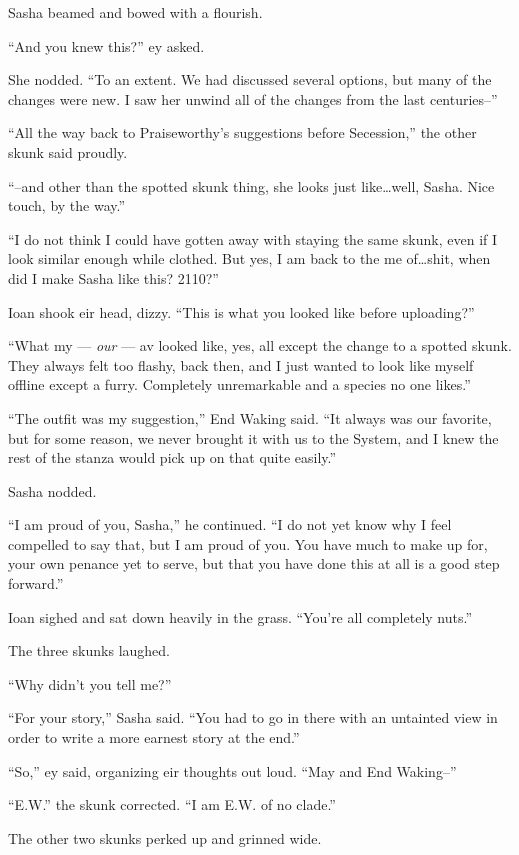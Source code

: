 Sasha beamed and bowed with a flourish.

``And you knew this?'' ey asked.

She nodded. ``To an extent. We had discussed several options, but many of the changes were new. I saw her unwind all of the changes from the last centuries--''

``All the way back to Praiseworthy's suggestions before Secession,'' the other skunk said proudly.

``--and other than the spotted skunk thing, she looks just like\ldots well, Sasha. Nice touch, by the way.''

``I do not think I could have gotten away with staying the same skunk, even if I look similar enough while clothed. But yes, I am back to the me of\ldots shit, when did I make Sasha like this? 2110?''

Ioan shook eir head, dizzy. ``This is what you looked like before uploading?''

``What my — \emph{our} — av looked like, yes, all except the change to a spotted skunk. They always felt too flashy, back then, and I just wanted to look like myself offline except a furry. Completely unremarkable and a species no one likes.''

``The outfit was my suggestion,'' End Waking said. ``It always was our favorite, but for some reason, we never brought it with us to the System, and I knew the rest of the stanza would pick up on that quite easily.''

Sasha nodded.

``I am proud of you, Sasha,'' he continued. ``I do not yet know why I feel compelled to say that, but I am proud of you. You have much to make up for, your own penance yet to serve, but that you have done this at all is a good step forward.''

Ioan sighed and sat down heavily in the grass. ``You're all completely nuts.''

The three skunks laughed.

``Why didn't you tell me?''

``For your story,'' Sasha said. ``You had to go in there with an untainted view in order to write a more earnest story at the end.''

``So,'' ey said, organizing eir thoughts out loud. ``May and End Waking--''

``E.W.'' the skunk corrected. ``I am E.W. of no clade.''

The other two skunks perked up and grinned wide.

